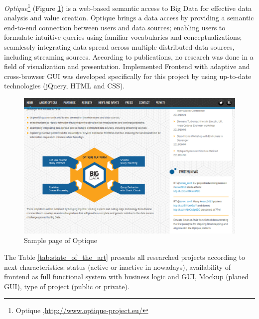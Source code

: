     \emph{Optique}\footnote{Optique ,\url{http://www.optique-project.eu/}} (Figure \ref{img:optique}) is a web-based  semantic access to Big Data for effective data analysis and value creation. Optique brings a data access by providing a semantic end-to-end connection between users and data sources; enabling users to formulate intuitive queries using familiar vocabularies and conceptualizations; seamlessly integrating data spread across multiple distributed data sources, including streaming sources\cite{calvanese-etal-JAIR-2013-explanation,ernestojimenezruizbernardocuencagrau2013ontology,DBLP:conf/dlog/MollerNOW13ohneCross}. According to publications, no research was done in a field of visualization and presentation. Implemented Frontend with adaptive and cross-browser GUI was developed specifically for this project by using up-to-date technologies (jQuery, HTML and CSS).
    \begin{figure}[!ht]
		\centering
		\includegraphics[scale=0.6]{Material/examples/Optique.png}   
		\caption[Sample page of Optique]{Sample page of Optique}  
		\label{img:optique}                
		\end{figure} 

    The Table \ref{tab:state_of_the_art} presents all researched projects according to next characteristics: status (active or inactive in nowadays), availability of frontend as full functional system with business logic and GUI, Mockup (planed GUI), type of project (public or private).

